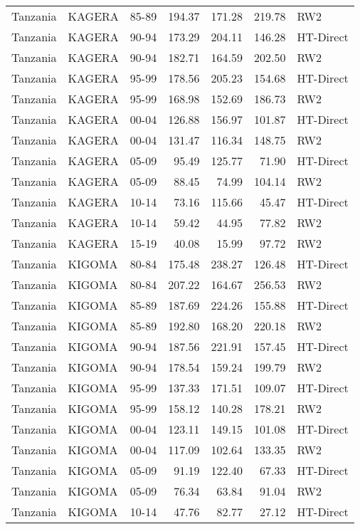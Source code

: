 \begin{longtable}{lllrrrl}
  Tanzania & KAGERA & 85-89 & 194.37 & 171.28 & 219.78 & RW2 \\ 
  Tanzania & KAGERA & 90-94 & 173.29 & 204.11 & 146.28 & HT-Direct \\ 
  Tanzania & KAGERA & 90-94 & 182.71 & 164.59 & 202.50 & RW2 \\ 
  Tanzania & KAGERA & 95-99 & 178.56 & 205.23 & 154.68 & HT-Direct \\ 
  Tanzania & KAGERA & 95-99 & 168.98 & 152.69 & 186.73 & RW2 \\ 
  Tanzania & KAGERA & 00-04 & 126.88 & 156.97 & 101.87 & HT-Direct \\ 
  Tanzania & KAGERA & 00-04 & 131.47 & 116.34 & 148.75 & RW2 \\ 
  Tanzania & KAGERA & 05-09 & 95.49 & 125.77 & 71.90 & HT-Direct \\ 
  Tanzania & KAGERA & 05-09 & 88.45 & 74.99 & 104.14 & RW2 \\ 
  Tanzania & KAGERA & 10-14 & 73.16 & 115.66 & 45.47 & HT-Direct \\ 
  Tanzania & KAGERA & 10-14 & 59.42 & 44.95 & 77.82 & RW2 \\ 
  Tanzania & KAGERA & 15-19 & 40.08 & 15.99 & 97.72 & RW2 \\ 
  Tanzania & KIGOMA & 80-84 & 175.48 & 238.27 & 126.48 & HT-Direct \\ 
  Tanzania & KIGOMA & 80-84 & 207.22 & 164.67 & 256.53 & RW2 \\ 
  Tanzania & KIGOMA & 85-89 & 187.69 & 224.26 & 155.88 & HT-Direct \\ 
  Tanzania & KIGOMA & 85-89 & 192.80 & 168.20 & 220.18 & RW2 \\ 
  Tanzania & KIGOMA & 90-94 & 187.56 & 221.91 & 157.45 & HT-Direct \\ 
  Tanzania & KIGOMA & 90-94 & 178.54 & 159.24 & 199.79 & RW2 \\ 
  Tanzania & KIGOMA & 95-99 & 137.33 & 171.51 & 109.07 & HT-Direct \\ 
  Tanzania & KIGOMA & 95-99 & 158.12 & 140.28 & 178.21 & RW2 \\ 
  Tanzania & KIGOMA & 00-04 & 123.11 & 149.15 & 101.08 & HT-Direct \\ 
  Tanzania & KIGOMA & 00-04 & 117.09 & 102.64 & 133.35 & RW2 \\ 
  Tanzania & KIGOMA & 05-09 & 91.19 & 122.40 & 67.33 & HT-Direct \\ 
  Tanzania & KIGOMA & 05-09 & 76.34 & 63.84 & 91.04 & RW2 \\ 
  Tanzania & KIGOMA & 10-14 & 47.76 & 82.77 & 27.12 & HT-Direct \\ 

\end{longtable}
